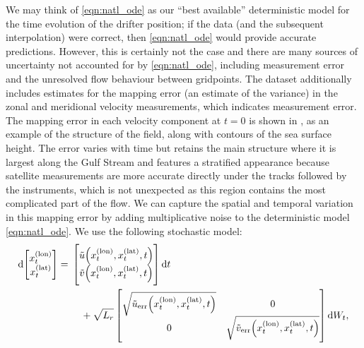 We may think of \cref{eqn:natl_ode} as our ``best available'' deterministic model for the time evolution of the drifter position; if the data (and the subsequent interpolation) were correct, then \cref{eqn:natl_ode} would provide accurate predictions.
However, this is certainly not the case and there are many sources of uncertainty not accounted for by \cref{eqn:natl_ode}, including measurement error and the unresolved flow behaviour between gridpoints.
The dataset additionally includes estimates for the mapping error (an estimate of the variance) in the zonal and meridional velocity measurements, which indicates measurement error. %
The mapping error in each velocity component at \(t = 0\) is shown in , as an example of the structure of the field, along with contours of the sea surface height.
The error varies with time but retains the main structure where it is largest along the Gulf Stream and features a stratified appearance because satellite measurements are more accurate directly under the tracks followed by the instruments, which is not unexpected as this region contains the most complicated part of the flow.
We can capture the spatial and temporal variation in this mapping error by adding multiplicative noise to the deterministic model \cref{eqn:natl_ode}.
We use the following stochastic model:
\begin{equation}
	\dif \begin{bmatrix}
		x^{(\mathrm{lon})}_t \\ x^{(\mathrm{lat})}_t
	\end{bmatrix} = \begin{multlined}[t]
		\begin{bmatrix} \tilde{u}\!\left(x^{(\mathrm{lon})}_t, x^{(\mathrm{lat})}_t, t\right) \\ \tilde{v}\!\left(x^{(\mathrm{lon})}_t, x^{(\mathrm{lat})}_t, t\right) \end{bmatrix}\dif t \\
		+ \sqrt{L_r}\begin{bmatrix}
			\sqrt{\tilde{u}_{\mathrm{err}}\!\left(x^{(\mathrm{lon})}_t, x^{(\mathrm{lat})}_t, t\right)} & 0                                                                                           \\
			0                                                                                           & \sqrt{\tilde{v}_{\mathrm{err}}\!\left(x^{(\mathrm{lon})}_t, x^{(\mathrm{lat})}_t, t\right)}
		\end{bmatrix} \dif W_t,
	\end{multlined}
	\label{eqn:natl_sde}
\end{equation}
